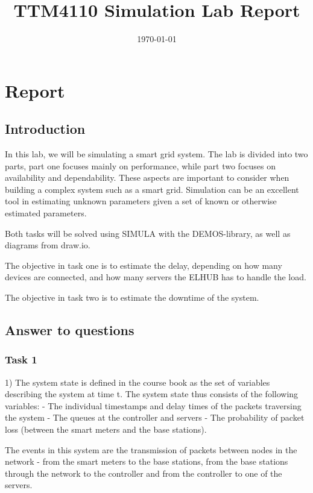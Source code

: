 \documentclass[11pt]{article}
\title{TTM4110 Simulation Lab Report}
\date{{\today}}
\begin{document}
\pagestyle{plain}

\maketitle

\section{Report}

\subsection{Introduction}

In this lab, we will be simulating a smart grid system. The lab is divided into two parts, part one focuses mainly on performance, while part two focuses on availability and dependability. These aspects are important to consider when building a complex system such as a smart grid. Simulation can be an excellent tool in estimating unknown parameters given a set of known or otherwise estimated parameters.

Both tasks will be solved using SIMULA with the DEMOS-library, as well as diagrams from draw.io.

The objective in task one is to estimate the delay, depending on how many devices are connected, and how many servers the ELHUB has to handle the load.

The objective in task two is to estimate the downtime of the system.

\newpage
\subsection{Answer to questions}

\subsubsection{Task 1}

1) The system state is defined in the course book as the set of variables describing the system at time t. The system state thus consists of the following variables:
- The individual timestamps and delay times of the packets traversing the system
- The queues at the controller and servers
- The probability of packet loss (between the smart meters and the base stations).

The events in this system are the transmission of packets between nodes in the network - from the smart meters to the base stations, from the base stations through the network to the controller and from the controller to one of the servers.\\
\end{document}
